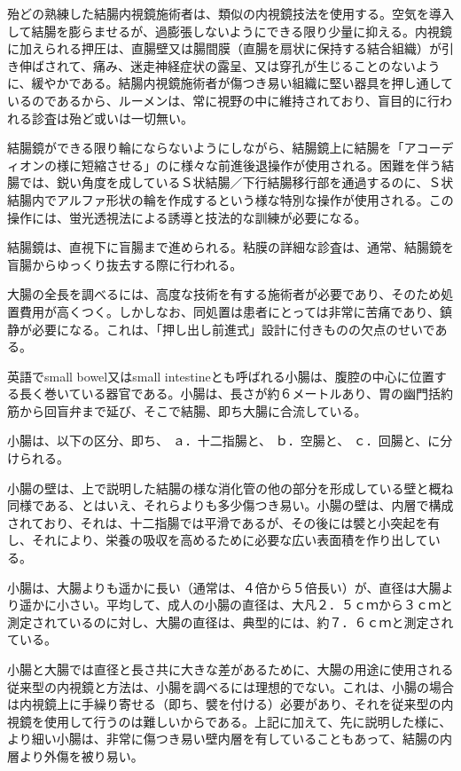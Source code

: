 殆どの熟練した結腸内視鏡施術者は、類似の内視鏡技法を使用する。空気を導入して結腸を膨らませるが、過膨張しないようにできる限り少量に抑える。内視鏡に加えられる押圧は、直腸壁又は腸間膜（直腸を扇状に保持する結合組織）が引き伸ばされて、痛み、迷走神経症状の露呈、又は穿孔が生じることのないように、緩やかである。結腸内視鏡施術者が傷つき易い組織に堅い器具を押し通しているのであるから、ルーメンは、常に視野の中に維持されており、盲目的に行われる診査は殆ど或いは一切無い。

結腸鏡ができる限り輪にならないようにしながら、結腸鏡上に結腸を「アコーディオンの様に短縮させる」のに様々な前進後退操作が使用される。困難を伴う結腸では、鋭い角度を成しているＳ状結腸／下行結腸移行部を通過するのに、Ｓ状結腸内でアルファ形状の輪を作成するという様な特別な操作が使用される。この操作には、蛍光透視法による誘導と技法的な訓練が必要になる。

結腸鏡は、直視下に盲腸まで進められる。粘膜の詳細な診査は、通常、結腸鏡を盲腸からゆっくり抜去する際に行われる。

大腸の全長を調べるには、高度な技術を有する施術者が必要であり、そのため処置費用が高くつく。しかしなお、同処置は患者にとっては非常に苦痛であり、鎮静が必要になる。これは、「押し出し前進式」設計に付きものの欠点のせいである。

英語でsmall bowel又はsmall intestineとも呼ばれる小腸は、腹腔の中心に位置する長く巻いている器官である。小腸は、長さが約６メートルあり、胃の幽門括約筋から回盲弁まで延び、そこで結腸、即ち大腸に合流している。

小腸は、以下の区分、即ち、 ａ．十二指腸と、 ｂ．空腸と、 ｃ．回腸と、に分けられる。

小腸の壁は、上で説明した結腸の様な消化管の他の部分を形成している壁と概ね同様である、とはいえ、それらよりも多少傷つき易い。小腸の壁は、内層で構成されており、それは、十二指腸では平滑であるが、その後には襞と小突起を有し、それにより、栄養の吸収を高めるために必要な広い表面積を作り出している。

小腸は、大腸よりも遥かに長い（通常は、４倍から５倍長い）が、直径は大腸より遥かに小さい。平均して、成人の小腸の直径は、大凡２．５ｃｍから３ｃｍと測定されているのに対し、大腸の直径は、典型的には、約７．６ｃｍと測定されている。

小腸と大腸では直径と長さ共に大きな差があるために、大腸の用途に使用される従来型の内視鏡と方法は、小腸を調べるには理想的でない。これは、小腸の場合は内視鏡上に手繰り寄せる（即ち、襞を付ける）必要があり、それを従来型の内視鏡を使用して行うのは難しいからである。上記に加えて、先に説明した様に、より細い小腸は、非常に傷つき易い壁内層を有していることもあって、結腸の内層より外傷を被り易い。


